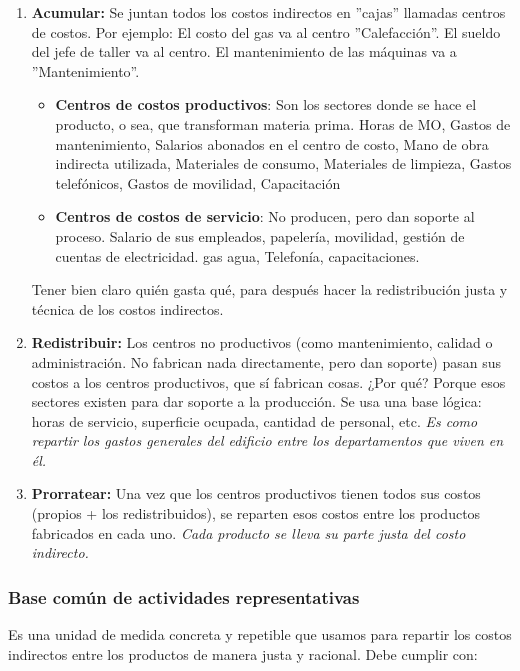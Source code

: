 \documentclass[a4paper,oneside,11pt]{article}
\begin{document}
\begin{enumerate}
    \item \textbf{Acumular:} Se juntan todos los costos indirectos en ''cajas'' llamadas centros de costos. Por ejemplo: El costo del gas va al centro ''Calefacción''. El sueldo del jefe de taller va al centro. El mantenimiento de las máquinas va a ''Mantenimiento''.
    
    \begin{itemize}
        \item \textbf{Centros de costos productivos}: Son los sectores donde se hace el producto, o sea, que transforman materia prima. Horas de MO, Gastos de mantenimiento, Salarios abonados en el centro de costo, Mano de obra indirecta utilizada, Materiales de consumo, Materiales de limpieza, Gastos telefónicos, Gastos de movilidad, Capacitación
        \item \textbf{Centros de costos de servicio}: No producen, pero dan soporte al proceso. Salario de sus empleados, papelería, movilidad, gestión de cuentas de electricidad. gas agua, Telefonía, capacitaciones.
    \end{itemize}

    Tener bien claro quién gasta qué, para después hacer la redistribución justa y técnica de los costos indirectos.

    \item \textbf{Redistribuir:} Los centros no productivos (como mantenimiento, calidad o administración. No fabrican nada directamente, pero dan soporte) pasan sus costos a los centros productivos, que sí fabrican cosas. ¿Por qué? Porque esos sectores existen para dar soporte a la producción. Se usa una base lógica: horas de servicio, superficie ocupada, cantidad de personal, etc. \textit{Es como repartir los gastos generales del edificio entre los departamentos que viven en él.}
    \item \textbf{Prorratear:} Una vez que los centros productivos tienen todos sus costos (propios + los redistribuidos), se reparten esos costos entre los productos fabricados en cada uno. \textit{Cada producto se lleva su parte justa del costo indirecto.}
\end{enumerate}

\subsubsection{Base común de actividades representativas}

Es una unidad de medida concreta y repetible que usamos para repartir los costos indirectos entre los productos de manera justa y racional. Debe cumplir con:
\end{document}
